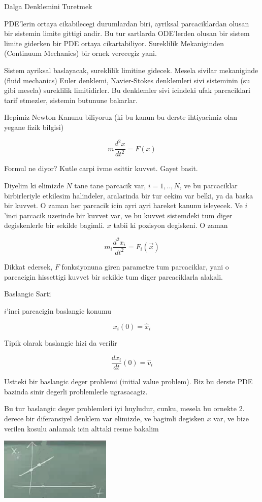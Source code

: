 \documentclass[12pt,fleqn]{article}\usepackage{../common}
\begin{document}
Dalga Denklemini Turetmek 

PDE'lerin ortaya cikabilecegi durumlardan biri, ayriksal parcaciklardan
olusan bir sistemin limite gittigi andir. Bu tur sartlarda ODE'lerden
olusan bir sistem limite giderken bir PDE ortaya cikartabiliyor. Sureklilik
Mekaniginden (Continuum Mechanics) bir ornek verecegiz yani.

Sistem ayriksal baslayacak, sureklilik limitine gidecek. Mesela sivilar
mekaniginde (fluid mechanics) Euler denklemi, Navier-Stokes denklemleri
sivi sisteminin (su gibi mesela) sureklilik limitidirler. Bu denklemler
sivi icindeki ufak parcaciklari tarif etmezler, sistemin butunune
bakarlar. 

Hepimiz Newton Kanunu biliyoruz (ki bu kanun bu derste ihtiyacimiz olan
yegane fizik bilgisi)

\[ m \frac{d^2x}{dt^2} = F(x) \]

Formul ne diyor? Kutle carpi ivme esittir kuvvet. Gayet basit.

Diyelim ki elimizde $N$ tane tane parcacik var, $i=1,..,N$, ve bu
parcaciklar birbirleriyle etkilesim halindeler, aralarinda bir tur cekim
var belki, ya da baska bir kuvvet. O zaman her parcacik icin ayri ayri
hareket kanunu isleyecek. Ve $i$'inci parcacik uzerinde bir kuvvet var, ve
bu kuvvet sistemdeki tum diger degiskenlerle bir sekilde bagimli. $x$ tabii
ki pozisyon degiskeni. O zaman

\[ m_i \frac{d^2x_i}{dt^2} = F_i(\vec{x}) \]

Dikkat edersek, $F$ fonksiyonuna giren parametre tum parcaciklar, yani o
parcacigin hissettigi kuvvet bir sekilde tum diger parcaciklarla alakali. 

Baslangic Sarti

$i$'inci parcacigin baslangic konumu

\[ x_i(0) = \hat{x}_i \]

Tipik olarak baslangic hizi da verilir

\[ \frac{dx_i}{dt}(0) = \hat{v}_i \]

Ustteki bir baslangic deger problemi (initial value problem). Biz bu derste
PDE bazinda sinir degerli problemlerle ugrasacagiz. 

Bu tur baslangic deger problemleri iyi huyludur, cunku, mesela bu ornekte
2. derece bir diferansiyel denklem var elimizde, ve bagimli degisken $x$
var, ve bize verilen kosulu anlamak icin alttaki resme bakalim


\includegraphics[height=3cm]{1_06.png}
\end{document}
